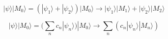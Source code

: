 \documentclass[20pt]{extreport}
\def\a{|\psi_1\rangle}
\def\b{|\psi_2\rangle}
\def\da{|M_{1}\rangle}
\def\db{|M_{2}\rangle}
\def\m0{| M_0 \rangle}
\begin{document}
$$\displaystyle |\psi\rangle \m0 = (\a + \b)\m0 \to   \a\da + \b\db
$$

$$\displaystyle |\psi\rangle  \m0 = \big(\sum_n c_n|\psi_n\rangle\big)  \m0 \to  \sum_n (c_n |\psi_n\rangle  |M_n\rangle)
$$
\end{document}
